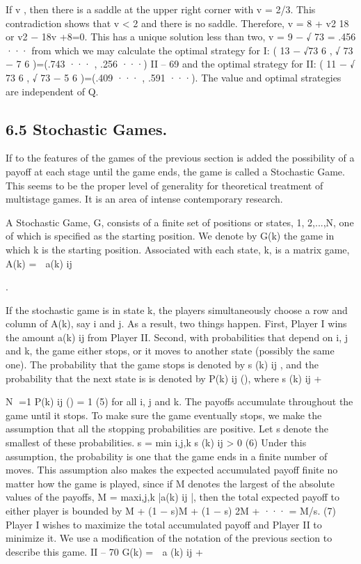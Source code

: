 \documentclass[]{report}
\begin{document}
If v , then there is a saddle at the upper right corner with v = 2/3. This contradiction
shows that v < 2 and there is no saddle. Therefore,
v = 8 + v2
18
or v2 − 18v +8=0.
This has a unique solution less than two,
v = 9 − √
73 = .456 ···
from which we may calculate the optimal strategy for I:
(
13 − √73
6 ,
√
73 − 7
6 )=(.743 ··· , .256 ···)
II – 69
and the optimal strategy for II:
(
11 − √
73
6 ,
√
73 − 5
6 )=(.409 ··· , .591 ···).
The value and optimal strategies are independent of Q.
\subsection{6.5 Stochastic Games.} If to the features of the games of the previous section is
added the possibility of a payoff at each stage until the game ends, the game is called
a Stochastic Game. This seems to be the proper level of generality for theoretical
treatment of multistage games. It is an area of intense contemporary research. %
\begin{framed}
A Stochastic Game, G, consists of a finite set of positions or states, {1, 2,...,N}, one
of which is specified as the starting position. We denote by G(k) the game in which k is the
starting position. Associated with each state, k, is a matrix game, A(k) = 
a(k)
ij 

. 
\end{framed}

If the
stochastic game is in state k, the players simultaneously choose a row and column of A(k),
say i and j. As a result, two things happen. First, Player I wins the amount a(k)
ij from
Player II. Second, with probabilities that depend on i, j and k, the game either stops, or
it moves to another state (possibly the same one). The probability that the game stops is
denoted by s
(k)
ij , and the probability that the next state is  is denoted by P(k)
ij (), where
s
(k)
ij +

N
=1
P(k)
ij () = 1 (5)
for all i, j and k.
The payoffs accumulate throughout the game until it stops. To make sure the game
eventually stops, we make the assumption that all the stopping probabilities are positive.
Let s denote the smallest of these probabilities.
s = min
i,j,k
s
(k)
ij > 0 (6)
Under this assumption, the probability is one that the game ends in a finite number of
moves. This assumption also makes the expected accumulated payoff finite no matter how
the game is played, since if M denotes the largest of the absolute values of the payoffs,
M = maxi,j,k |a(k)
ij |, then the total expected payoff to either player is bounded by
M + (1 − s)M + (1 − s)
2M + ··· = M/s. (7)
Player I wishes to maximize the total accumulated payoff and Player II to minimize
it. We use a modification of the notation of the previous section to describe this game.
II – 70
G(k) =

a
(k)
ij +
\end{document}
